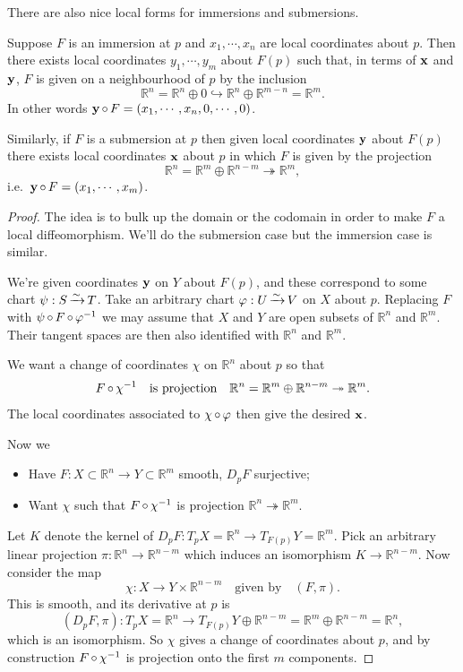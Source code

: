 \documentclass[a4paper,11pt]{article}
\begin{document}
	There are also nice local forms for immersions and submersions.

	\begin{lem}
		Suppose $F$ is an immersion at $p$ and $x_1, \cdots, x_n$ are local coordinates about $p$. Then there exists local coordinates $y_1, \cdots, y_m$ about $F(p)$ such that, in terms of $\vb x$ and $\vb y$, $F$ is given on a neighbourhood of $p$ by the inclusion
		\[
			\mathbb{R}^n = \mathbb{R}^n \oplus 0 \hookrightarrow \mathbb{R}^n \oplus \mathbb{R}^{m-n} = \mathbb{R}^m.
		\]
		In other words $\vb y \operatorname{\circ} F = (x_1, \cdots, x_n, 0, \cdots, 0)$.

		Similarly, if $F$ is a submersion at $p$ then given local coordinates $\vb y$ about $F(p)$ there exists local coordinates $\vb x$ about $p$ in which $F$ is given by the projection
		\[
			\mathbb{R}^n = \mathbb{R}^m \oplus \mathbb{R}^{n-m} \twoheadrightarrow \mathbb{R}^m,
		\]
		i.e.\ $\vb y \operatorname{\circ} F = (x_1, \cdots, x_m)$.
	\end{lem}
	\begin{proof}
		The idea is to bulk up the domain or the codomain in order to make $F$ a local diffeomorphism. We'll do the submersion case but the immersion case is similar.

		We're given coordinates $\vb y$ on $Y$ about $F(p)$, and these correspond to some chart $\psi : S \operatorname{\xrightarrow{\sim}} T$. Take an arbitrary chart $\varphi : U \operatorname{\xrightarrow{\sim}} V$ on $X$ about $p$. Replacing $F$ with $\psi \operatorname{\circ} F \operatorname{\circ} \varphi^{-1}$ we may assume that $X$ and $Y$ are open subsets of $\mathbb{R}^n$ and $\mathbb{R}^m$. Their tangent spaces are then also identified with $\mathbb{R}^n$ and $\mathbb{R}^m$.

		We want a change of coordinates $\chi$ on $\mathbb{R}^n$ about $p$ so that
		\[
			F \operatorname{\circ} \chi^{-1} \quad \text{is projection} \quad \mathbb{R}^n = \mathbb{R}^m \oplus \mathbb{R}^{n-m} \twoheadrightarrow \mathbb{R}^m.
		\]
		The local coordinates associated to $\chi \operatorname{\circ} \varphi$ then give the desired $\vb x$.

		Now we
		\begin{itemize}
			\item Have $F : X \subset \mathbb{R}^n \to Y \subset \mathbb{R}^m$ smooth, $D_p F$ surjective;
			\item Want $\chi$ such that $F \operatorname{\circ} \chi^{-1}$ is projection $\mathbb{R}^n \twoheadrightarrow \mathbb{R}^m$.
		\end{itemize}

		Let $K$ denote the kernel of $D_p F : T_p X = \mathbb{R}^n \to T _{F(p)} Y = \mathbb{R}^m$. Pick an arbitrary linear projection $\pi : \mathbb{R}^n \to \mathbb{R}^{n-m}$ which induces an isomorphism $K \to \mathbb{R}^{n-m}$. Now consider the map
		\[
			\chi : X \to Y \times \mathbb{R}^{n-m} \quad \text{given by} \quad (F,\pi).
		\]
		This is smooth, and its derivative at $p$ is  
		\[
			(D_p F, \pi) : T_p X = \mathbb{R}^n \to T _{F(p)}Y \oplus \mathbb{R}^{n-m} = \mathbb{R}^m \oplus \mathbb{R}^{n-m} = \mathbb{R}^n,
		\]
		which is an isomorphism. So $\chi$ gives a change of coordinates about $p$, and by construction $F \operatorname{\circ} \chi^{-1}$ is projection onto the first $m$ components.
	\end{proof}
\end{document}
